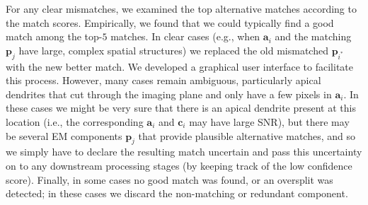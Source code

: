 \documentclass[10pt,letterpaper]{article}
\begin{document}
{For any clear mismatches, we examined the top alternative matches according to the match scores. Empirically, we found that we could typically find a good match among the top-$5$ matches.  In clear cases (e.g., when $\bm{a}_i$ and the matching $\bm{p}_j$ have large, complex spatial structures) we replaced the old mismatched $\bm{p}_{i^*}$ with the new better match.  We developed a graphical user interface to facilitate this process. However, many cases remain ambiguous, particularly apical dendrites that cut through the imaging plane and only have a few pixels in $\bm{a}_i$.  In these cases we might be very sure that there is an apical dendrite present at this location (i.e., the corresponding $\bm{a}_i$ and $\bm{c}_i$ may have large SNR), but there may be several EM components $\bm{p}_j$ that provide plausible alternative matches, and so we simply have to declare the resulting match uncertain and pass this uncertainty on to any downstream processing stages (by keeping track of the low confidence score).
Finally, in some cases no good match was found, or an oversplit was detected; in these cases we discard the non-matching or redundant component.







}
\end{document}
